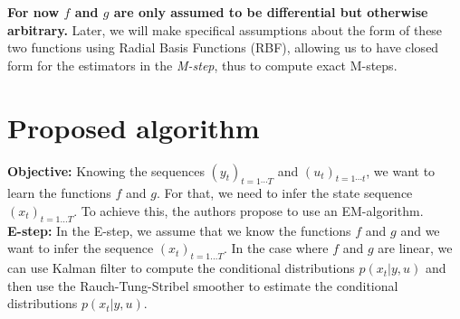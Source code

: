 \documentclass[11pt, oneside]{amsart}
\begin{document}
\indent \textbf{For now $f$  and  $g$  are only assumed to be differential but otherwise arbitrary.}
Later, we will make specifical assumptions about the form of these two functions using Radial Basis Functions (RBF), allowing us to have closed form for the estimators in the \textit{M-step}, thus to compute exact M-steps.\\ 


\section{Proposed algorithm}

\textbf{Objective:}  Knowing the sequences $(y_t)_{t=1 \cdots T}$ and $(u_t)_{t=1 \cdots t}$, we want to learn the functions $f$ and $g$.
For that, we need to infer the state sequence $(x_t)_{t=1...T}$.
To achieve this, the authors propose to use an EM-algorithm.\\




\noindent\textbf{E-step:}
In the E-step, we assume that we know the functions $f$ and $g$ and we want to infer the sequence $(x_t)_{t=1...T}$.
In the case where $f$ and $g$ are linear, we can use Kalman filter to compute the conditional distributions $p(x_t|y,u)$ and then use the Rauch-Tung-Stribel smoother to estimate the conditional distributions $p(x_t|y,u)$.
\end{document}
